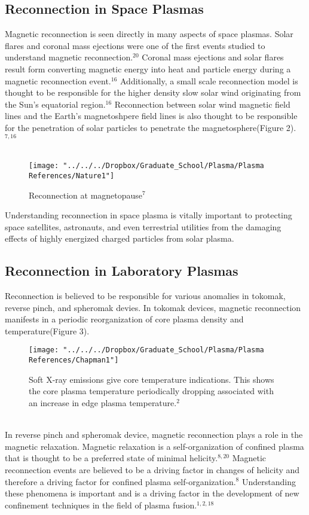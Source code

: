 \documentclass{article}
\begin{document}
\subsection{Reconnection in Space Plasmas}
Magnetic reconnection is seen directly in many aspects of space plasmas.  Solar flares and coronal mass ejections were one of the first events studied to understand magnetic reconnection.$^{20}$  Coronal mass ejections and solar flares result form converting magnetic energy into heat and particle energy during a magnetic reconnection event.$^{16}$  Additionally, a small scale reconnection model is thought to be responsible for the higher density slow solar wind originating from the Sun's equatorial region.$^{16}$  Reconnection between solar wind magnetic field lines and the Earth's magnetoshpere field lines is also thought to be responsible for the penetration of solar particles to penetrate the magnetosphere(Figure 2).$^{7,16}$\\\\\begin{figure}
\centering
\texttt{[image: "../../../Dropbox/Graduate\_School/Plasma/Plasma References/Nature1"]}
\caption{Reconnection at magnetopause$^{7}$}
\label{fig:Nature1}
\end{figure}
Understanding reconnection in space plasma is vitally important to protecting space satellites, astronauts, and even terrestrial utilities from the damaging effects of highly energized charged particles from solar plasma.
\subsection{Reconnection in Laboratory Plasmas}
Reconnection is believed to be responsible for various anomalies in tokomak, reverse pinch, and spheromak devies.  In tokomak devices, magnetic reconnection manifests in a periodic reorganization of core plasma density and temperature(Figure 3).  
\begin{figure}[h]
\centering
\texttt{[image: "../../../Dropbox/Graduate\_School/Plasma/Plasma References/Chapman1"]}
\caption{Soft X-ray emissions give core temperature indications. This shows the core plasma temperature periodically dropping associated with an increase in edge plasma temperature.$^{2}$}
\label{fig:Chapman1}
\end{figure}
\\In reverse pinch and spheromak device, magnetic reconnection plays a role in the magnetic relaxation.  Magnetic relaxation is a self-organization of confined plasma that is thought to be a preferred state of minimal helicity.$^{8,20}$  Magnetic reconnection events are believed to be a driving factor in changes of helicity and therefore a driving factor for confined plasma self-organization.$^{8}$  Understanding these phenomena is important and is a driving factor in the development of new confinement techniques in the field of plasma fusion.$^{1,2,18}$
\end{document}
